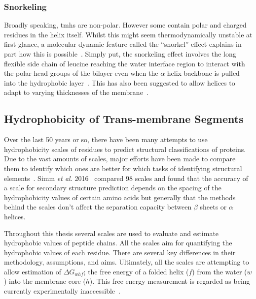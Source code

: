 \subsubsection{Snorkeling}

Broadly speaking, \gls{tmh}s are non-polar. However some contain polar and  charged residues in the helix itself. Whilst this might seem thermodynamically unstable at first glance, a molecular dynamic feature called the ``snorkel'' effect explains in part how this is possible~\cite{Chamberlain2004, Strandberg2003}. Simply put, the snorkeling effect involves the long flexible side chain of leucine reaching the water interface region to interact with the polar head-groups of the bilayer even when the $\alpha$ helix backbone is pulled into the hydrophobic layer~\cite{Krishnakumar2007}. This has also been suggested to allow helices to adapt to varying thicknesses of the membrane~\cite{Kandasamy2006}.


\subsection{Hydrophobicity of Trans-membrane Segments}

Over the last 50 years or so, there have been many attempts to use hydrophobicity scales of residues to predict structural classifications of proteins. Due to the vast amounts of scales, major efforts have been made to compare them to identify which ones are better for which tasks of identifying structural elements~\cite{Simm2016, Peters2014}. Simm \textit{ et al.} 2016~\cite{Simm2016} compared 98 scales and found that the accuracy of a scale for secondary structure prediction depends on the spacing of the hydrophobicity values of certain amino acids but generally that the methods behind the scales don't affect the separation capacity between $ \beta $ sheets or $ \alpha $ helices.

Throughout this thesis several scales are used to evaluate and estimate hydrophobic values of peptide chains. All the scales aim for quantifying the hydrophobic values of each residue. There are several key differences in their methodology, assumptions, and aims. Ultimately, all the scales are attempting to allow estimation of ${\Delta G}_{whf}$; the free energy of a folded helix ($ f $) from the water ($w$) into the membrane core ($h$). This free energy measurement is regarded as being currently experimentally inaccessible~\cite{Cymer2014}.


